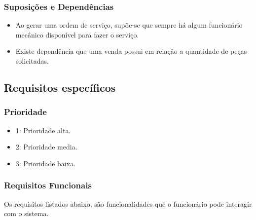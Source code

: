 	
	\subsubsection{Suposições e Dependências}
		\begin{itemize}
			\item Ao gerar uma ordem  de serviço, supõe-se que sempre há algum funcionário mecânico disponível para fazer o serviço.
			\item Existe dependência que uma venda possui em relação a quantidade de peças solicitadas.			
		\end{itemize}
	
	
\subsection{Requisitos específicos}

\subsubsection{Prioridade}
	\begin{itemize}
		\item 1: Prioridade alta.
		\item 2: Prioridade media.
		\item 3: Prioridade baixa.
	\end{itemize}

\subsubsection{Requisitos Funcionais}
\par
Os requisitos listados abaixo, são funcionalidades que o funcionário pode interagir com o sistema.

